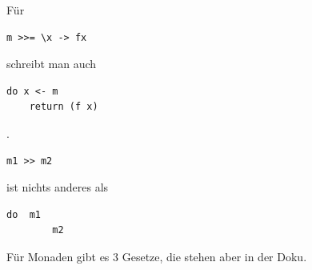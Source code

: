 \documentclass[ngerman,a4paper]{report}
\begin{document}
Für
\begin{lstlisting}
m >>= \x -> fx
\end{lstlisting}
schreibt man auch
\begin{lstlisting}
do x <- m
	return (f x)
\end{lstlisting}
.\\

\begin{lstlisting}
m1 >> m2
\end{lstlisting}
ist nichts anderes als
\begin{lstlisting}
do	m1
		m2
\end{lstlisting}

Für Monaden gibt es 3 Gesetze, die stehen aber in der Doku.
\end{document}
